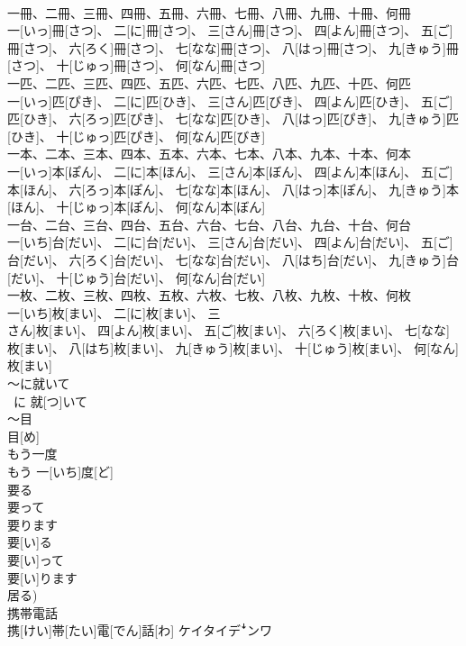 \documentclass[8pt]{extreport}
\begin{document}
\begin{CJK}{UTF8}{min}
\\	一冊、二冊、三冊、四冊、五冊、六冊、七冊、八冊、九冊、十冊、何冊	
\\	一[いっ]冊[さつ]、 二[に]冊[さつ]、 三[さん]冊[さつ]、 四[よん]冊[さつ]、 五[ご]冊[さつ]、 六[ろく]冊[さつ]、 七[なな]冊[さつ]、 八[はっ]冊[さつ]、 九[きゅう]冊[さつ]、 十[じゅっ]冊[さつ]、 何[なん]冊[さつ]	
\\	一匹、二匹、三匹、四匹、五匹、六匹、七匹、八匹、九匹、十匹、何匹	
\\	一[いっ]匹[ぴき]、 二[に]匹[ひき]、 三[さん]匹[びき]、 四[よん]匹[ひき]、 五[ご]匹[ひき]、 六[ろっ]匹[ぴき]、 七[なな]匹[ひき]、 八[はっ]匹[ぴき]、 九[きゅう]匹[ひき]、 十[じゅっ]匹[ぴき]、 何[なん]匹[びき]	
\\	一本、二本、三本、四本、五本、六本、七本、八本、九本、十本、何本	
\\	一[いっ]本[ぽん]、 二[に]本[ほん]、 三[さん]本[ぼん]、 四[よん]本[ほん]、 五[ご]本[ほん]、 六[ろっ]本[ぽん]、 七[なな]本[ほん]、 八[はっ]本[ぽん]、 九[きゅう]本[ほん]、 十[じゅっ]本[ぽん]、 何[なん]本[ぼん]	
\\	一台、二台、三台、四台、五台、六台、七台、八台、九台、十台、何台	
\\	一[いち]台[だい]、 二[に]台[だい]、 三[さん]台[だい]、 四[よん]台[だい]、 五[ご]台[だい]、 六[ろく]台[だい]、 七[なな]台[だい]、 八[はち]台[だい]、 九[きゅう]台[だい]、 十[じゅう]台[だい]、 何[なん]台[だい]	
\\	一枚、二枚、三枚、四枚、五枚、六枚、七枚、八枚、九枚、十枚、何枚	
\\	一[いち]枚[まい]、 二[に]枚[まい]、 三
\\	さん]枚[まい]、 四[よん]枚[まい]、 五[ご]枚[まい]、 六[ろく]枚[まい]、 七[なな]枚[まい]、 八[はち]枚[まい]、 九[きゅう]枚[まい]、 十[じゅう]枚[まい]、 何[なん]枚[まい]	
\\	～に就いて	
\\	~に 就[つ]いて	
\\	～目	
\\	目[め]	
\\	もう一度	
\\	もう 一[いち]度[ど]	
\\	要る 
\\	要って 
\\	要ります	
\\	要[い]る 
\\	要[い]って 
\\	要[い]ります 
\\	居る)	
\\	携帯電話	
\\	携[けい]帯[たい]電[でん]話[わ]	ケイタイデꜜンワ

\end{CJK}
\end{document}
